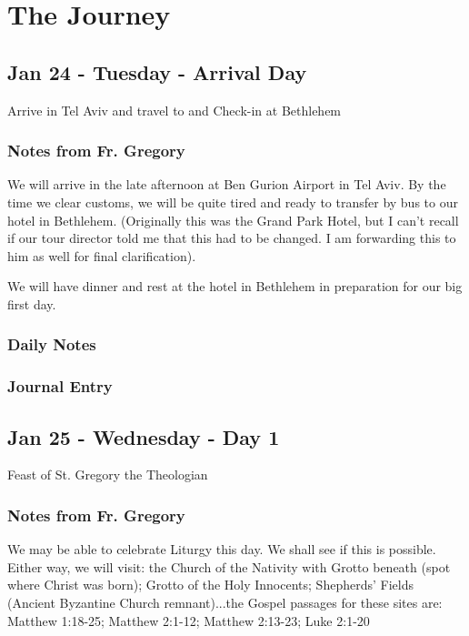 \documentclass[letterpaper]{report}
\begin{document}
\chapter{The Journey}
\section{Jan 24 - Tuesday - Arrival Day}
Arrive in Tel Aviv and travel to and Check-in at Bethlehem

\subsection{Notes from Fr. Gregory}
We will arrive in the late afternoon at Ben Gurion Airport in Tel Aviv.
By the time we clear customs, we will be quite tired and ready to transfer by bus 
to our hotel in Bethlehem.
(Originally this was the Grand Park Hotel, but I can't recall if our tour 
director told me that this had to be changed.
I am forwarding this to him as well for final clarification).


We will have dinner and rest at the hotel in Bethlehem in preparation for our
big first day.

\subsection{Daily Notes}

\subsection{Journal Entry}

\clearpage
\section{Jan 25 - Wednesday - Day 1}
Feast of St. Gregory the Theologian

\subsection{Notes from Fr. Gregory}
We may be able to celebrate Liturgy this day. We shall see if this is possible. Either way, we will visit: the Church of the Nativity with Grotto beneath (spot where Christ was born); Grotto of the Holy Innocents; Shepherds' Fields (Ancient Byzantine Church remnant)...the Gospel passages for these sites are: 
Matthew 1:18-25; Matthew 2:1-12; Matthew 2:13-23; Luke 2:1-20
\end{document}
